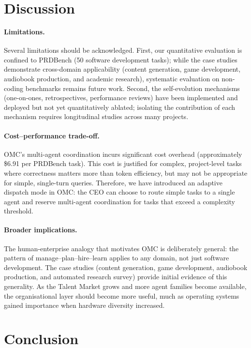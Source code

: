 \documentclass[11pt,a4paper]{article}
\begin{document}
\section{Discussion}
\label{sec:discussion}

\paragraph{Limitations.}
Several limitations should be acknowledged.  First, our quantitative evaluation is confined to PRDBench (50 software development tasks); while the case studies demonstrate cross-domain applicability (content generation, game development, audiobook production, and academic research), systematic evaluation on non-coding benchmarks remains future work.  Second, the self-evolution mechanisms (one-on-ones, retrospectives, performance reviews) have been implemented and deployed but not yet quantitatively ablated; isolating the contribution of each mechanism requires longitudinal studies across many projects.
\paragraph{Cost--performance trade-off.}
OMC's multi-agent coordination incurs significant cost overhead (approximately \$6.91 per PRDBench task).  This cost is justified for complex, project-level tasks where correctness matters more than token efficiency, but may not be appropriate for simple, single-turn queries. Therefore, we have introduced an adaptive dispatch mode in OMC: the CEO can choose to route simple tasks to a single agent and reserve multi-agent coordination for tasks that exceed a complexity threshold.

\paragraph{Broader implications.}
The human-enterprise analogy that motivates OMC is deliberately general: the pattern of manage--plan--hire--learn applies to any domain, not just software development.  The case studies (content generation, game development, audiobook production, and automated research survey) provide initial evidence of this generality.  As the Talent Market grows and more agent families become available, the organisational layer should become more useful, much as operating systems gained importance when hardware diversity increased.

\section{Conclusion}
\label{sec:conclusion}
\end{document}
